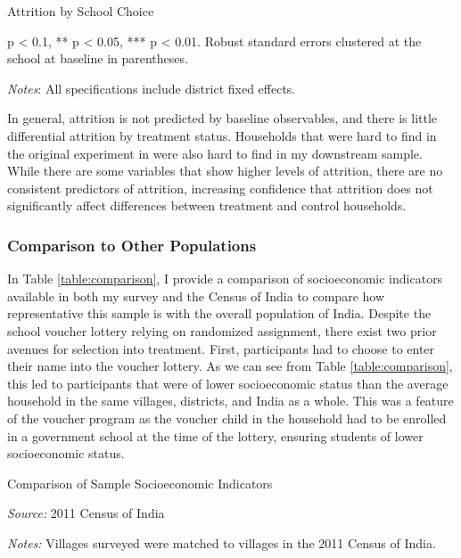 \documentclass[hidelinks, 12pt, titlepage]{article}
\begin{document}
			\begin{table}[htb]
				\begin{threeparttable}
					\centering
					\caption{Attrition by School Choice\label{table:attritionschoolchoice}}
					
					\begin{tablenotes}
						\item * p < 0.1, ** p < 0.05, *** p < 0.01. Robust standard errors clustered at the school at baseline in parentheses.
						\item \emph{Notes}: All specifications include district fixed effects.
					\end{tablenotes}
				\end{threeparttable}
			\end{table}

			In general, attrition is not predicted by baseline observables, and there is little differential attrition by treatment status.  Households that were hard to find in the original experiment in \cite{Muralidharan2015} were also hard to find in my downstream sample.  While there are some variables that show higher levels of attrition, there are no consistent predictors of attrition, increasing confidence that attrition does not significantly affect differences between treatment and control households.

		\clearpage

		\subsubsection{Comparison to Other Populations}

			In Table \ref{table:comparison}, I provide a comparison of socioeconomic indicators available in both my survey and the Census of India to compare how representative this sample is with the overall population of India.  Despite the school voucher lottery relying on randomized assignment, there exist two prior avenues for selection into treatment.  First, participants had to choose to enter their name into the voucher lottery.  As we can see from Table \ref{table:comparison}, this led to participants that were of lower socioeconomic status than the average household in the same villages, districts, and India as a whole.  This was a feature of the voucher program as the voucher child in the household had to be enrolled in a government school at the time of the lottery, ensuring students of lower socioeconomic status.

			\begin{table}[htbp]
				\begin{threeparttable}
					\caption{Comparison of Sample Socioeconomic Indicators\label{table:comparison}}
					\centering
					
					\begin{tablenotes}
						\item \emph{Source:} 2011 Census of India
						\item \emph{Notes:} Villages surveyed were matched to villages in the 2011 Census of India.
					\end{tablenotes}
				\end{threeparttable}
			\end{table}
\end{document}

